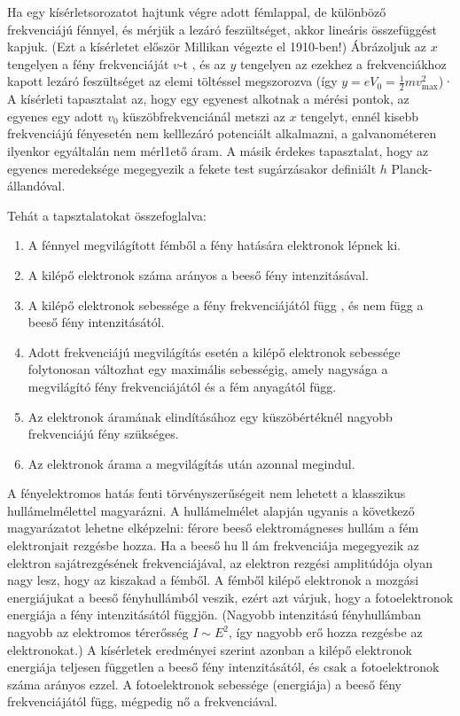 \documentclass[../main.tex]{subfiles}
\begin{document}
Ha egy kísérletsorozatot hajtunk végre adott fémlappal, de különböző frekvenciájú fénnyel, és mérjük a lezáró feszültséget, akkor lineáris összefüggést kapjuk. (Ezt a kísérletet először Millikan végezte
el 1910-ben!) Ábrázoljuk az $x$ tengelyen a fény frekvenciáját $v$-t , és az $y$ tengelyen az ezekhez a frekvenciákhoz kapott lezáró feszültséget az elemi töltéssel megszorozva 
(így $y = eV_0 = \frac{1}{2}mv_{\text{max}}^2$)· A kísérleti tapasztalat az, hogy egy egyenest alkotnak a mérési pontok, az egyenes egy adott $v_0$ küszöbfrekvenciánál metszi az $x$ tengelyt, 
ennél kisebb frekvenciájú fényesetén nem kelllezáró potenciált alkalmazni, a galvanométeren ilyenkor egyáltalán nem mérl1ető áram. A másik érdekes tapasztalat, hogy az egyenes meredeksége megegyezik a fekete test sugárzásakor definiált $h$ Planck-állandóval.

Tehát a tapsztalatokat összefoglalva:
\begin{enumerate}
    \item A fénnyel megvilágított fémből a fény hatására elektronok lépnek ki.
    \item A kilépő elektronok száma arányos a beeső fény intenzitásával.
    \item A kilépő elektronok sebessége a fény frekvenciájától függ , és nem függ a beeső fény intenzitásától.
    \item Adott frekvenciájú megvilágítás esetén a kilépő elektronok sebessége folytonosan változhat egy maximális sebességig, amely nagysága a megvilágító fény frekvenciájától és a fém anyagától függ.
    \item Az elektronok áramának elindításához egy küszöbértéknél nagyobb frekvenciájú fény szükséges.
    \item Az elektronok árama a megvilágítás után azonnal megindul.
\end{enumerate}

A fényelektromos hatás fenti törvényszerűségeit nem lehetett a klasszikus hullámelmélettel magyarázni. A hullámelmélet alapján ugyanis a következő magyarázatot lehetne elképzelni: férore beeső elektromágneses hullám a
fém elektronjait rezgésbe hozza. Ha a beeső hu ll ám frekvenciája megegyezik az elektron sajátrezgésének frekvenciájával, az elektron rezgési amplitúdója olyan nagy lesz, hogy az kiszakad a fémből. A fémből kilépő elektronok a
mozgási energiájukat a beeső fényhullámból veszik, ezért azt várjuk, hogy a fotoelektronok energiája a fény intenzitásától függjön. (Nagyobb intenzitású fényhullámban nagyobb az elektromos térerősség $I \sim E^2$, így nagyobb
erő hozza rezgésbe az elektronokat.) A kísérletek eredményei szerint azonban a kilépő elektronok energiája teljesen független a beeső fény intenzitásától, és csak a fotoelektronok száma arányos ezzel. A fotoelektronok sebessége
(energiája) a beeső fény frekvenciájától függ, mégpedig nő a frekvenciával.
\end{document}
